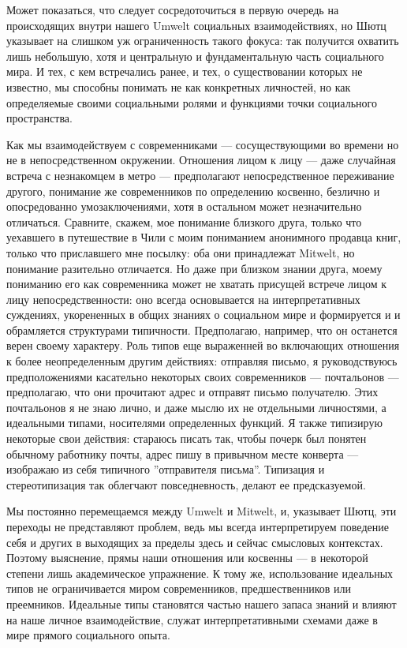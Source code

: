 \documentclass[11pt]{book}
\begin{document}
Может показаться, что следует сосредоточиться в первую очередь на происходящих внутри нашего Umwelt социальных взаимодействиях, но Шютц указывает на слишком уж ограниченность такого фокуса: так получится охватить лишь небольшую, хотя и центральную и фундаментальную часть социального мира. И тех, с кем встречались ранее, и тех, о существовании которых не известно, мы способны понимать не как конкретных личностей, но как определяемые своими социальными ролями и функциями точки социального пространства.

Как мы взаимодействуем с современниками --- сосуществующими во времени но не в непосредственном окружении. Отношения лицом к лицу --- даже случайная встреча с незнакомцем в метро --- предполагают непосредственное переживание другого, понимание же современников по определению косвенно, безлично и опосредованно умозаключениями, хотя в остальном может незначительно отличаться. Сравните, скажем, мое понимание близкого друга, только что уехавшего в путешествие в Чили с моим пониманием анонимного продавца книг, только что приславшего мне посылку: оба они принадлежат Mitwelt, но понимание разительно отличается. Но даже при близком знании друга, моему пониманию его как современника может не хватать присущей встрече лицом к лицу непосредственности: оно всегда основывается на интерпретативных суждениях, укорененных в общих знаниях о социальном мире и формируется и и обрамляется структурами типичности. Предполагаю, например, что он останется верен своему характеру. Роль типов еще выраженней во включающих отношения к более неопределенным другим действиях: отправляя письмо, я руководствуюсь предположениями касательно некоторых своих современников --- почтальонов --- предполагаю, что они прочитают адрес и отправят письмо получателю. Этих почтальонов я не знаю лично, и даже мыслю их не отдельными личностями, а идеальными типами, носителями определенных функций. Я также типизирую некоторые свои действия: стараюсь писать так, чтобы почерк был понятен обычному работнику почты, адрес пишу в привычном месте конверта --- изображаю из себя типичного ''отправителя письма''. Типизация и стереотипизация так облегчают повседневность, делают ее предсказуемой.

Мы постоянно перемещаемся между Umwelt и Mitwelt, и, указывает Шютц, эти переходы не представляют проблем, ведь мы всегда интерпретируем поведение себя и других в выходящих за пределы здесь и сейчас смысловых контекстах. Поэтому выяснение, прямы наши отношения или косвенны --- в некоторой степени лишь академическое упражнение. К тому же, использование идеальных типов не ограничивается миром современников, предшественников или преемников. Идеальные типы становятся частью нашего запаса знаний и влияют на наше личное взаимодействие, служат интерпретативными схемами даже в мире прямого социального опыта.
\end{document}
